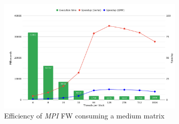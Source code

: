 \begin{figure}[h!]
\centering                                                                        
\includegraphics[width=3.5in]{diagrams/cuda-time}
\captionsetup{justification=centering}                                                                                                                                   
\caption{Efficiency of \emph{MPI} FW consuming a medium matrix}                                                                                                                                            
\label{fig:cuda-time}                                                                                                                                                           
\end{figure}






























































